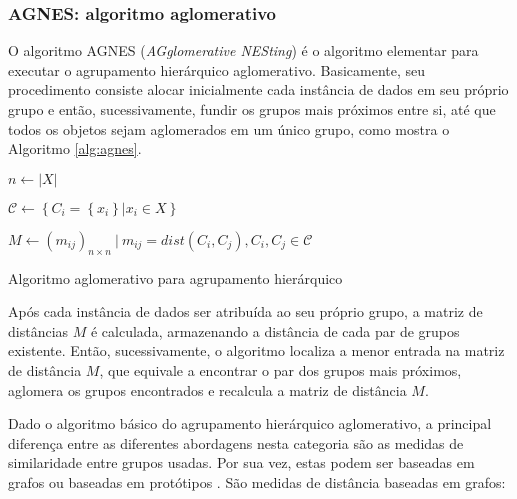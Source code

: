 \subsubsection{AGNES: algoritmo aglomerativo}
	\label{subsec:agnes}

O algoritmo AGNES (\emph{AGglomerative NESting}) é o algoritmo elementar para
executar o agrupamento hierárquico aglomerativo. Basicamente, seu procedimento
consiste alocar inicialmente cada instância de dados em seu próprio grupo e
então, sucessivamente, fundir os grupos mais próximos entre si, até que todos os
objetos sejam aglomerados em um único grupo, como mostra o Algoritmo
\ref{alg:agnes}.

\begin{algorithm}[htbp]
	
	$n \leftarrow \left|X\right|$ \;
			
	$\mathcal{C} \leftarrow \left\{ C_i = \left\{x_i\right\} | 
		x_i \in X \right\} $ \;
		
	$M \leftarrow \left(m_{ij}\right)_{n \times n}\ |\ m_{ij} = 
		dist\left(C_i,C_j\right), C_i, C_j \in \mathcal{C}$ \;
	
	
	\caption{Algoritmo aglomerativo para agrupamento hierárquico}
	\label{alg:agnes}
\end{algorithm}


Após cada instância de dados ser atribuída ao seu próprio grupo, a matriz de
distâncias $M$ é calculada, armazenando a distância de cada par de grupos
existente. Então, sucessivamente, o algoritmo localiza a menor entrada na matriz
de distância $M$, que equivale a encontrar o par dos grupos mais próximos,
aglomera os grupos encontrados e recalcula a matriz de distância $M$.

Dado o algoritmo básico do agrupamento hierárquico aglomerativo, a principal
diferença entre as diferentes abordagens nesta categoria são as medidas de 
similaridade entre grupos usadas. Por sua vez, estas podem ser baseadas em
grafos ou baseadas em protótipos \cite{tan2009introducao}. São medidas de
distância baseadas em grafos:


